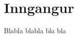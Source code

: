 \documentclass[12pt, draft, isbabel]{rureport}
\begin{document}
\maketitle

\tableofcontents

\listoffixmes

\clearpage

\section{Inngangur}

Blabla blabla bla bla

\begin{figure}
	\centering
	\
\end{figure}


\printbibliography
\end{document}
